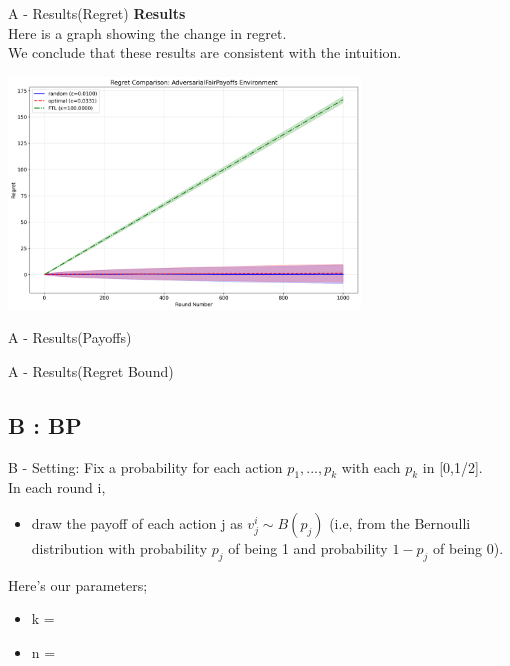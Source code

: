 \documentclass{beamer}
\begin{document}
\begin{frame}{A - Results(Regret)}
\textbf{Results}\\
Here is a graph showing the change in regret. \\
We conclude that these results are consistent with the intuition.
\begin{center}
    \includegraphics[width=0.7\textwidth]{332Project2/figures/adversarial_regret_comparison.png}
\end{center}
\end{frame}

\begin{frame}{A - Results(Payoffs)}

\end{frame}

\begin{frame}{A - Results(Regret Bound)}
    
\end{frame}

\subsection{B : BP}

\begin{frame}{B - Setting:}
    Fix a probability for each action $p_{1},...,p_{k}$ with each $p_{k}$ in [0,1/2].\\
    In each round i,
    \begin{itemize}
        \item draw the payoff of each action j as $v^{i}_{j} \sim B(p_{j})$ (i.e, from the Bernoulli distribution with probability $p_j$ of being 1 and probability $1-p_{j}$ of being 0).
    \end{itemize}
    \vspace{1em}
    Here's our parameters;
    \begin{itemize}
        \item k = 
        \item n = 
    \end{itemize}
\end{frame}
\end{document}
